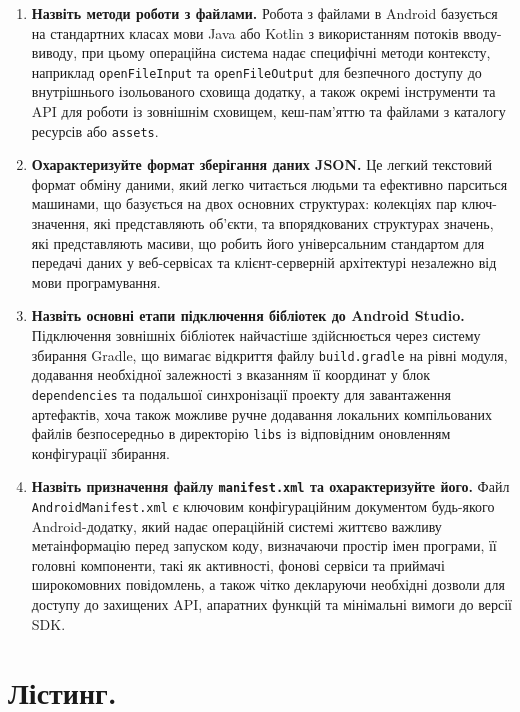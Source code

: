 \documentclass[14pt, a4paper]{extreport}
\begin{document}
\begin{enumerate}
		\item \textbf{Назвіть методи роботи з файлами.} Робота з файлами в Android базується на стандартних класах мови Java або Kotlin з використанням потоків вводу-виводу, при цьому операційна система надає специфічні методи контексту, наприклад \texttt{openFileInput} та \texttt{openFileOutput} для безпечного доступу до внутрішнього ізольованого сховища додатку, а також окремі інструменти та API для роботи із зовнішнім сховищем, кеш-пам'яттю та файлами з каталогу ресурсів або \texttt{assets}.
		
		\item \textbf{Охарактеризуйте формат зберігання даних JSON.} Це легкий текстовий формат обміну даними, який легко читається людьми та ефективно парситься машинами, що базується на двох основних структурах: колекціях пар ключ-значення, які представляють об'єкти, та впорядкованих структурах значень, які представляють масиви, що робить його універсальним стандартом для передачі даних у веб-сервісах та клієнт-серверній архітектурі незалежно від мови програмування.
		
		\item \textbf{Назвіть основні етапи підключення бібліотек до Android Studio.} Підключення зовнішніх бібліотек найчастіше здійснюється через систему збирання Gradle, що вимагає відкриття файлу \texttt{build.gradle} на рівні модуля, додавання необхідної залежності з вказанням її координат у блок \texttt{dependencies} та подальшої синхронізації проекту для завантаження артефактів, хоча також можливе ручне додавання локальних компільованих файлів безпосередньо в директорію \texttt{libs} із відповідним оновленням конфігурації збирання.
		
		\item \textbf{Назвіть призначення файлу \texttt{manifest.xml} та охарактеризуйте його.} Файл \texttt{AndroidManifest.xml} є ключовим конфігураційним документом будь-якого Android-додатку, який надає операційній системі життєво важливу метаінформацію перед запуском коду, визначаючи простір імен програми, її головні компоненти, такі як активності, фонові сервіси та приймачі широкомовних повідомлень, а також чітко декларуючи необхідні дозволи для доступу до захищених API, апаратних функцій та мінімальні вимоги до версії SDK.
	\end{enumerate}

	\pagebreak

	\section*{Лістинг.}
\end{document}
